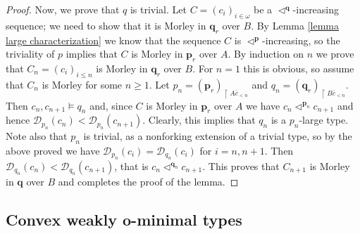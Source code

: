 \documentclass{amsart}
\theoremstyle{definition}
\theoremstyle{definition}
\def\strok{\restriction}
\begin{document}
\begin{proof}
Now, we prove that $q$ is trivial. Let $C=(c_i)_{i\in\omega}$ be a $\triangleleft^{\mathbf q}$-increasing sequence; we need to show that it is Morley in $\mathbf q_r$ over $B$. By Lemma \ref{lemma large characterization} we know that the sequence $C$ is $\triangleleft^{\mathbf p}$-increasing, so the triviality of $p$ implies that $C$ is Morley in $\mathbf p_r$ over $A$. 
By induction on $n$ we prove that $C_n=(c_i)_{i\leqslant n}$ is Morley in $\mathbf q_r$ over $B$. For $n=1$ this is obvious, so assume that $C_n$ is Morley for some $n\geqslant 1$. Let $p_n=(\mathbf p_r)_{\strok A\bar c_{<n}}$ and $q_n=(\mathbf q_r)_{\strok B\bar c_{<n}}$. Then $c_n,c_{n+1}\models q_n$ and, since $C$ is Morley in $\mathbf p_r$ over $A$ we have $c_n \triangleleft^{\mathbf p_n} c_{n+1}$ and hence $\mathcal D_{p_n}(c_n)<\mathcal D_{p_n}(c_{n+1})$. Clearly, this implies that $q_n$ is a $p_n$-large type. Note also that $p_n$ is trivial, as a nonforking extension of a trivial type, so by the above proved we have $\mathcal D_{p_n}(c_i)=\mathcal D_{q_n}(c_{i})$ for $i=n,n+1$. Then $\mathcal D_{q_n}(c_n)<\mathcal D_{q_n}(c_{n+1})$, that is $c_n \triangleleft^{\mathbf q_n} c_{n+1}$. This proves that $C_{n+1}$ is Morley in $\mathbf q$ over $B$ and completes the proof of the lemma.
\end{proof}


\subsection{Convex weakly o-minimal types}\label{Subsection convex}
\end{document}
